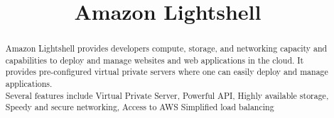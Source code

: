 \documentclass{article}
\begin{document}
\title{Amazon Lightshell}
\maketitle
	\begin{abstract}

	Amazon Lightshell provides developers compute, storage, and networking capacity and capabilities 	to deploy and manage websites and web applications in the cloud. It provides pre-configured virtual 	private servers where one can easily deploy and manage applications.\\

	Several features include Virtual Private Server, Powerful API, Highly available storage, Speedy and 	secure networking, Access to AWS Simplified load balancing \cite{ref:lightshell}


	
	
	\end{abstract}
\end{document}
